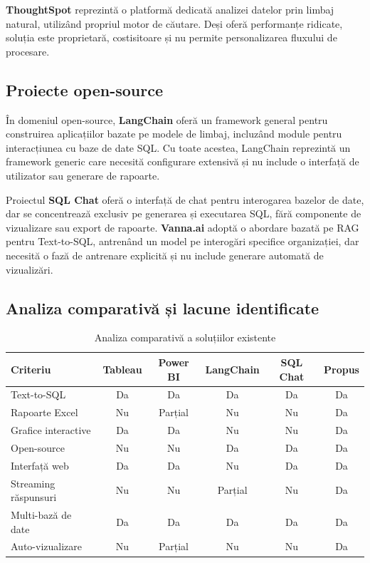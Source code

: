 \documentclass[12pt, a4paper]{report}
\begin{document}
\textbf{ThoughtSpot} reprezintă o platformă dedicată analizei datelor prin limbaj natural, utilizând propriul motor de căutare. Deși oferă performanțe ridicate, soluția este proprietară, costisitoare și nu permite personalizarea fluxului de procesare.

\subsection{Proiecte open-source}

În domeniul open-source, \textbf{LangChain} \cite{langchain} oferă un framework general pentru construirea aplicațiilor bazate pe modele de limbaj, incluzând module pentru interacțiunea cu baze de date SQL. Cu toate acestea, LangChain reprezintă un framework generic care necesită configurare extensivă și nu include o interfață de utilizator sau generare de rapoarte.

Proiectul \textbf{SQL Chat} oferă o interfață de chat pentru interogarea bazelor de date, dar se concentrează exclusiv pe generarea și executarea SQL, fără componente de vizualizare sau export de rapoarte. \textbf{Vanna.ai} adoptă o abordare bazată pe RAG pentru Text-to-SQL, antrenând un model pe interogări specifice organizației, dar necesită o fază de antrenare explicită și nu include generare automată de vizualizări.

\subsection{Analiza comparativă și lacune identificate}

\begin{table}[H]
\centering
\caption{Analiza comparativă a soluțiilor existente}
\label{tab:comparatie}
\begin{tabularx}{\textwidth}{l c c c c c}
\toprule
\textbf{Criteriu} & \textbf{Tableau} & \textbf{Power BI} & \textbf{LangChain} & \textbf{SQL Chat} & \textbf{Propus} \\
\midrule
Text-to-SQL & Da & Da & Da & Da & Da \\
Rapoarte Excel & Nu & Parțial & Nu & Nu & Da \\
Grafice interactive & Da & Da & Nu & Nu & Da \\
Open-source & Nu & Nu & Da & Da & Da \\
Interfață web & Da & Da & Nu & Da & Da \\
Streaming răspunsuri & Nu & Nu & Parțial & Nu & Da \\
Multi-bază de date & Da & Da & Da & Da & Da \\
Auto-vizualizare & Nu & Parțial & Nu & Nu & Da \\
\bottomrule
\end{tabularx}
\end{table}
\end{document}
